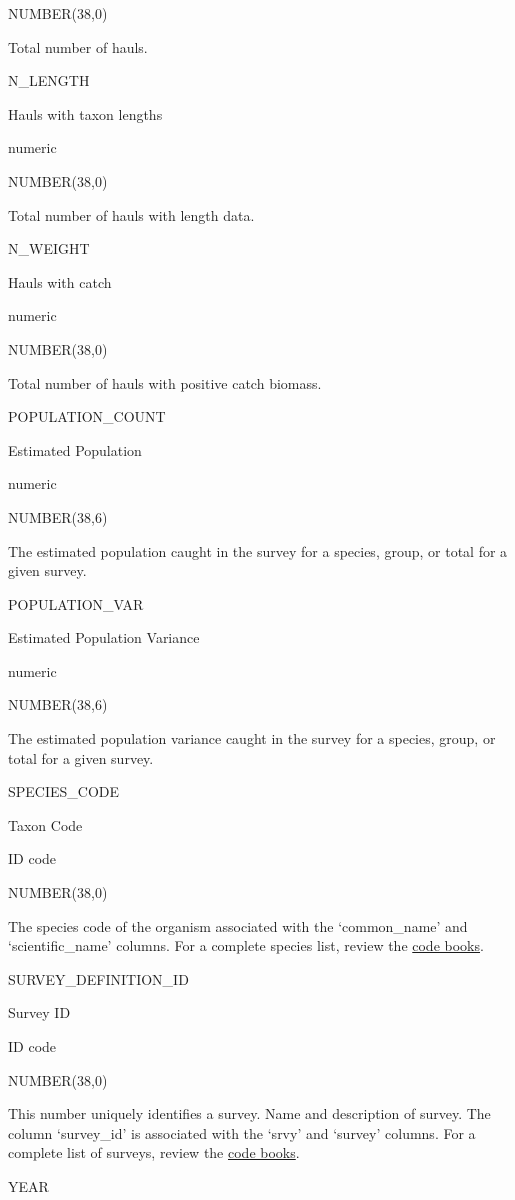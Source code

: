 \documentclass[
  letterpaper,
  oneside,
  open=any]{scrbook}
\begin{document}
NUMBER(38,0)

Total number of hauls.

N\_LENGTH

Hauls with taxon lengths

numeric

NUMBER(38,0)

Total number of hauls with length data.

N\_WEIGHT

Hauls with catch

numeric

NUMBER(38,0)

Total number of hauls with positive catch biomass.

POPULATION\_COUNT

Estimated Population

numeric

NUMBER(38,6)

The estimated population caught in the survey for a species, group, or
total for a given survey.

POPULATION\_VAR

Estimated Population Variance

numeric

NUMBER(38,6)

The estimated population variance caught in the survey for a species,
group, or total for a given survey.

SPECIES\_CODE

Taxon Code

ID code

NUMBER(38,0)

The species code of the organism associated with the `common\_name' and
`scientific\_name' columns. For a complete species list, review the
\href{https://www.fisheries.noaa.gov/resource/document/groundfish-survey-species-code-manual-and-data-codes-manual}{code
books}.

SURVEY\_DEFINITION\_ID

Survey ID

ID code

NUMBER(38,0)

This number uniquely identifies a survey. Name and description of
survey. The column `survey\_id' is associated with the `srvy' and
`survey' columns. For a complete list of surveys, review the
\href{https://www.fisheries.noaa.gov/resource/document/groundfish-survey-species-code-manual-and-data-codes-manual}{code
books}.

YEAR
\end{document}
